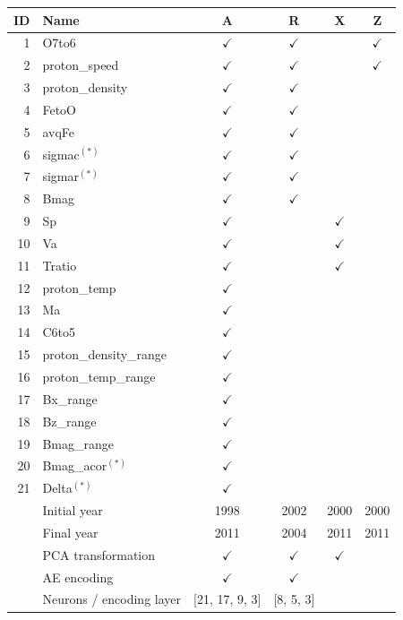 \documentclass[utf8]{frontiersSCNS} %
\begin{document}
\begin{table}\centering
	\begin{tabular}{@{}rlcccc@{}}
		\toprule
		ID & Name  & A & R & X & Z \\
		\midrule
		1 & O7to6 & $\checkmark$ & $\checkmark$ & & $\checkmark$ \\
		2 & proton\_speed & $\checkmark$ & $\checkmark$ & & $\checkmark$ \\
		3 & proton\_density & $\checkmark$ & $\checkmark$ & & \\
		4 & FetoO & $\checkmark$ & $\checkmark$ & & \\
		5 & avqFe & $\checkmark$ & $\checkmark$ & & \\
		6 & sigmac$^{(*)}$ & $\checkmark$ & $\checkmark$ & & \\
		7 & sigmar$^{(*)}$ & $\checkmark$ & $\checkmark$ & & \\
		8 & Bmag & $\checkmark$ & $\checkmark$ & & \\
		9 & Sp & $\checkmark$ & & $\checkmark$ & \\
		10 & Va & $\checkmark$ & &$\checkmark$ & \\
		11 & Tratio & $\checkmark$ & & $\checkmark$ & \\
		12 & proton\_temp & $\checkmark$ & & & \\
		13 & Ma & $\checkmark$ & & & \\
		14 & C6to5 & $\checkmark$ & & & \\
		15 & proton\_density\_range & $\checkmark$ & & & \\
		16 & proton\_temp\_range & $\checkmark$ & & & \\
		17 & Bx\_range & $\checkmark$ & & & \\
		18 & Bz\_range & $\checkmark$ & & & \\
		19 & Bmag\_range & $\checkmark$ & & & \\
		20 & Bmag\_acor$^{(*)}$ & $\checkmark$ & & & \\
		21 & Delta$^{(*)}$ & $\checkmark$ & & & \\
		\midrule
		 & Initial year & 1998 & 2002 & 2000 & 2000 \\
		 & Final year & 2011 & 2004 & 2011 & 2011 \\
		 \midrule
		 & PCA transformation & $\checkmark$ & $\checkmark$ & $\checkmark$ &  \\
		 & AE encoding & $\checkmark$ & $\checkmark$ & & \\
		 & Neurons / encoding layer & [21, 17, 9, 3] & [8, 5, 3] & & \\

\end{tabular}
\end{table}
\end{document}
